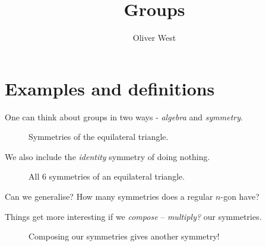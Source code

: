 \documentclass{../template/note}
\author{Oliver West}
\title{Groups}
\date{}
\begin{document}
    
    \maketitle

    \tableofcontents


    \section{Examples and definitions}

    One can think about groups in two ways - \emph{algebra} and \emph{symmetry}.

    \begin{figure}[ht]
        \centering
        \caption{Symmetries of the equilateral triangle.}
        \label{fig:equilateral-triangle-symmetry}
    \end{figure}
    
    \noindent We also include the \emph{identity} symmetry of doing nothing.

    \begin{figure}[ht]
        \centering
        \caption{All 6 symmetries of an equilateral triangle.}
        \label{fig:equilateral-triangle-all-symmetries}
    \end{figure}

    \begin{remark*}
        Can we generalise? How many symmetries does a regular \(n\)-gon have?
    \end{remark*}
    
    Things get more interesting if we \emph{compose} -- \emph{multiply?} our symmetries.

    \begin{figure}[ht]
        \centering
        \caption{Composing our symmetries gives another symmetry!}
        \label{fig:equilateral-triangle-composition-example*}
    \end{figure}
    
\end{document}
